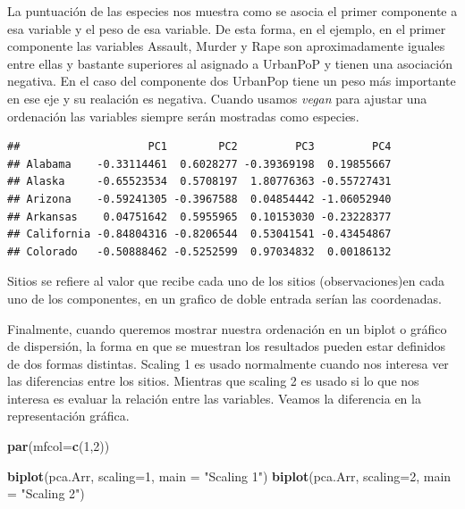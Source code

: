 \documentclass[]{book}
\newenvironment{Shaded}{\begin{snugshade}}{\end{snugshade}}
\newcommand{\KeywordTok}[1]{\textcolor[rgb]{0.13,0.29,0.53}{\textbf{{#1}}}}
\newcommand{\DataTypeTok}[1]{\textcolor[rgb]{0.13,0.29,0.53}{{#1}}}
\newcommand{\DecValTok}[1]{\textcolor[rgb]{0.00,0.00,0.81}{{#1}}}
\newcommand{\StringTok}[1]{\textcolor[rgb]{0.31,0.60,0.02}{{#1}}}
\newcommand{\CommentTok}[1]{\textcolor[rgb]{0.56,0.35,0.01}{\textit{{#1}}}}
\newcommand{\NormalTok}[1]{{#1}}
\begin{document}
La puntuación de las especies nos muestra como se asocia el primer
componente a esa variable y el peso de esa variable. De esta forma, en
el ejemplo, en el primer componente las variables Assault, Murder y Rape
son aproximadamente iguales entre ellas y bastante superiores al
asignado a UrbanPoP y tienen una asociación negativa. En el caso del
componente dos UrbanPop tiene un peso más importante en ese eje y su
realación es negativa. Cuando usamos \emph{vegan} para ajustar una
ordenación las variables siempre serán mostradas como especies.

\begin{Shaded}
\end{Shaded}

\begin{verbatim}
##                    PC1        PC2         PC3         PC4
## Alabama    -0.33114461  0.6028277 -0.39369198  0.19855667
## Alaska     -0.65523534  0.5708197  1.80776363 -0.55727431
## Arizona    -0.59241305 -0.3967588  0.04854442 -1.06052940
## Arkansas    0.04751642  0.5955965  0.10153030 -0.23228377
## California -0.84804316 -0.8206544  0.53041541 -0.43454867
## Colorado   -0.50888462 -0.5252599  0.97034832  0.00186132
\end{verbatim}

Sitios se refiere al valor que recibe cada uno de los sitios
(observaciones)en cada uno de los componentes, en un grafico de doble
entrada serían las coordenadas.

Finalmente, cuando queremos mostrar nuestra ordenación en un biplot o
gráfico de dispersión, la forma en que se muestran los resultados pueden
estar definidos de dos formas distintas. Scaling 1 es usado normalmente
cuando nos interesa ver las diferencias entre los sitios. Mientras que
scaling 2 es usado si lo que nos interesa es evaluar la relación entre
las variables. Veamos la diferencia en la representación gráfica.

\begin{Shaded}
\begin{Highlighting}[]
\KeywordTok{par}\NormalTok{(}\DataTypeTok{mfcol=}\KeywordTok{c}\NormalTok{(}\DecValTok{1}\NormalTok{,}\DecValTok{2}\NormalTok{))}

\KeywordTok{biplot}\NormalTok{(pca.Arr, }\DataTypeTok{scaling=}\DecValTok{1}\NormalTok{, }\DataTypeTok{main =} \StringTok{"Scaling 1"}\NormalTok{)}
\KeywordTok{biplot}\NormalTok{(pca.Arr, }\DataTypeTok{scaling=}\DecValTok{2}\NormalTok{, }\DataTypeTok{main =} \StringTok{"Scaling 2"}\NormalTok{)}
\end{Highlighting}
\end{Shaded}
\end{document}
